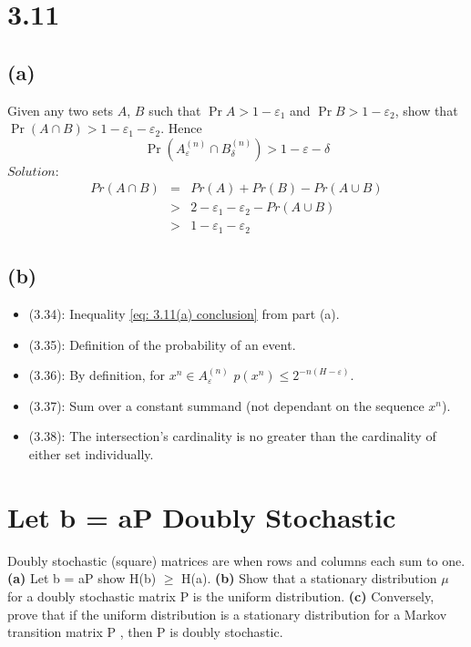 \documentclass[10pt]{article}
\begin{document}
\begin{tiny}
\begin{multicols}{3}
\section*{3.11}

\subsection*{(a)}

Given any two sets $A$, $B$ such that $\Pr{A} > 1-\varepsilon_1$ and
$\Pr{B} > 1-\varepsilon_2$, show that $\Pr(A\cap B) > 1 - \varepsilon_1 -
\varepsilon_2$. Hence
\begin{equation}
    \Pr(A_\varepsilon^{(n)} \cap B_\delta^{(n)}) > 1 - \varepsilon - \delta
    \label{eq: 3.11(a) conclusion}
\end{equation}
$Solution$:
\begin{eqnarray}
    Pr(A\cap B) &=& Pr(A) + Pr(B) - Pr(A\cup B)
    \label{eq: pr A intersect B} \\
    &>& 2 - \varepsilon_1 - \varepsilon_2 - Pr(A\cup B)
    \label{eq: sub hypotheses} \\
    &>& 1 - \varepsilon_1 - \varepsilon_2
    \label{eq: 3.11a}
\end{eqnarray}

\subsection*{(b)}
\begin{itemize}
    \item (3.34): Inequality \ref{eq: 3.11(a) conclusion} from part (a).
    \item (3.35): Definition of the probability of an event.
    \item (3.36): By definition, for $x^n \in A_\varepsilon^{(n)}$
        $p(x^n) \leq 2^{-n(H - \varepsilon)}$.
    \item (3.37): Sum over a constant summand (not dependant on the
        sequence $x^n$).
    \item (3.38): The intersection's cardinality is no greater than the cardinality of either set individually.
\end{itemize}


\section{  Let b = aP Doubly Stochastic}
Doubly stochastic (square) matrices are when rows and columns each sum to one. \textbf{(a)}  Let b = aP show H(b) $\ge$ H(a). \textbf{(b)} Show that a stationary distribution $\mu$ for a doubly stochastic matrix P is the uniform distribution. \textbf{(c)} Conversely, prove that if the uniform distribution is a stationary distribution for a Markov transition matrix P , then P is doubly stochastic.


\end{multicols}
\end{tiny}
\end{document}
